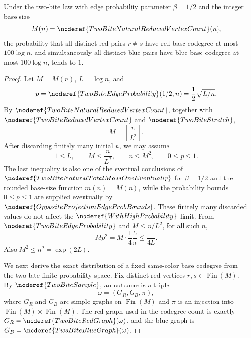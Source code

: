 \begin{lemma}
Under the two-bite law with edge probability parameter \(\beta=1/2\) and the integer base size
\[
M(n)=\noderef{TwoBiteNaturalReducedVertexCount}(n),
\]
the probability that all distinct red pairs \(r \ne s\) have red base codegree at most \(100\log n\), and simultaneously all distinct blue pairs have blue base codegree at most \(100\log n\), tends to \(1\).
\end{lemma}
\begin{proof}
Let \(M=M(n)\), \(L=\log n\), and
\[
p=\noderef{TwoBiteEdgeProbability}(1/2,n)=\frac12\sqrt{L/n}.
\]
By \(\noderef{TwoBiteNaturalReducedVertexCount}\), together with
\(\noderef{TwoBiteReducedVertexCount}\) and \(\noderef{TwoBiteStretch}\),
\[
M=\left\lfloor\frac n{L^2}\right\rfloor .
\]
After discarding finitely many initial \(n\), we may assume
\[
1\le L,\qquad M\le \frac n{L^2},\qquad n\le M^2,\qquad 0\le p\le1.
\tag{1}
\]
The last inequality is also one of the eventual conclusions of
\(\noderef{TwoBiteNaturalTotalMassOneEventually}\) for \(\beta=1/2\) and
the rounded base-size function \(m(n)=M(n)\), while the probability bounds
\(0\le p\le1\) are supplied eventually by
\(\noderef{OppositeProjectionEdgeProbBounds}\).  These finitely many
discarded values do not affect the \(\noderef{WithHighProbability}\) limit.
From \(\noderef{TwoBiteEdgeProbability}\) and \(M\le n/L^2\), for all such
\(n\),
\[
Mp^2
=M\cdot \frac14\frac{L}{n}
\le \frac1{4L}.
\tag{2}
\]
Also \(M^2\le n^2=\exp(2L)\).

We next derive the exact distribution of a fixed same-color base codegree
from the two-bite finite probability space.  Fix distinct red vertices
\(r,s\in\operatorname{Fin}(M)\).  By \(\noderef{TwoBiteSample}\), an outcome
is a triple
\[
\omega=(G_R,G_B,\pi),
\]
where \(G_R\) and \(G_B\) are simple graphs on \(\operatorname{Fin}(M)\) and
\(\pi\) is an injection into
\(\operatorname{Fin}(M)\times\operatorname{Fin}(M)\).  The red graph used in
the codegree count is exactly \(G_R=\noderef{TwoBiteRedGraph}(\omega)\), and
the blue graph is \(G_B=\noderef{TwoBiteBlueGraph}(\omega)\).


\end{proof}
